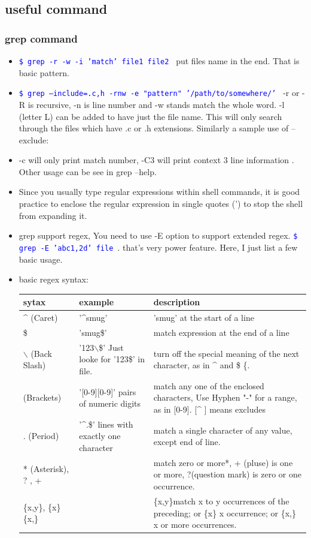 \documentclass[a4paper,12pt,twoside]{book}
\newcommand{\linuxcommand}[1]{\texttt{\textcolor{blue}{\$ #1 \Pisymbol{psy}{191}}}}
\begin{document}
\subsection{useful command}
\subsubsection{grep command}
\begin{itemize}
\item \linuxcommand{grep -r -w -i 'match' file1 file2} put files name in the end. That is basic pattern. 
\item \linuxcommand{grep --include=\*.{c,h} -rnw  -e "pattern" '/path/to/somewhere/'} -r or -R is recursive, -n is line number and -w stands match the whole word. -l (letter L) can be added to have just the file name. This will only search through the files which have .c or .h extensions. Similarly a sample use of --exclude: 
\item -c will only print  match number, -C3 will print context 3 line information . Other usage can be see in grep --help. 
\item Since you usually type regular expressions within shell commands, it is good practice to enclose the regular expression in single quotes (') to stop the shell from expanding it. 
\item grep support regex, You need to use -E option to support extended regex. \linuxcommand{grep -E 'abc{1,2}d' file}.  that's very power feature. Here, I just list a few basic usage. 
\item basic regex syntax:

 \begin{tabular}{|p{}|p{}|p{}|}
\hline 
sytax 	& example & 	description \\

\hline 
\^{} (Caret)	& '\^{}smug'  & 	'smug' at the start of a line \\
\hline 
\$ &  'smug\$' & 	match expression at the end of a line\\
\hline 
$\backslash$ (Back Slash)&   '123$\backslash$\$'  Just looke for '123\$' in file. &	turn off the special meaning of the next character, as in \^{} and \$ \{.   \\
\hline 
[ ] (Brackets)	&'[0-9][0-9]' pairs of numeric digits &	match any one of the enclosed characters,  Use Hyphen "-" for a range, as in [0-9].  [\^{} ] means excludes\\
\hline 
. (Period) & '\^{}.\$' lines with exactly one character  &	match a single character of any value, except end of line. \\
\hline 
* (Asterisk), ? , + &  &	match zero or more*,  + (pluse) is one or more,   ?(question mark) is zero or one occurrence.   \\
\hline 
\{x,y\}, 	\{x\}	\{x,\} & &	\{x,y\}match x to y occurrences of the preceding;  or \{x\} x occurrence; or  \{x,\} x or more occurrences. \\
\hline 


\end{tabular}
\end{itemize}
\end{document}
